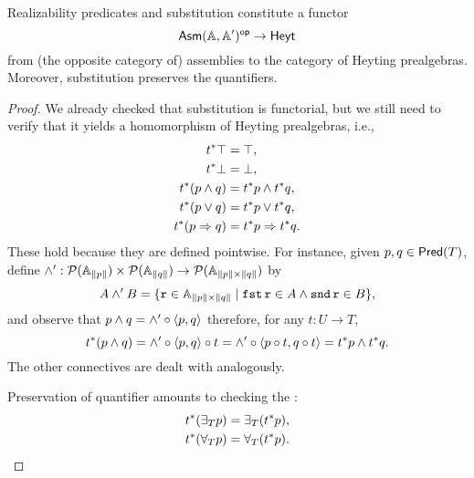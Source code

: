 \begin{proposition}
  Realizability predicates and substitution constitute a functor
  \begin{equation*}
    \mathsf{Asm}(\mathbb{A},\mathbb{A}')^{\mathsf{op}} \to \mathsf{Heyt}
  \end{equation*}
  from (the opposite category of) assemblies to the category of Heyting prealgebras.
  Moreover, substitution preserves the quantifiers.
\end{proposition}

\begin{proof}
  We already checked that substitution is functorial, but we still need to verify
  that it yields a homomorphism of Heyting prealgebras, i.e.,
  \begin{align*}
    t^{*} \top &= \top,\\
    t^{*} \bot &= \bot,\\
    t^{*} (p \land q) &= t^{*} p \land t^{*} q,\\
    t^{*} (p \lor q) &= t^{*} p \lor t^{*} q,\\
    t^{*} (p \Rightarrow q) &= t^{*} p \Rightarrow t^{*} q.
  \end{align*}
  These hold because they are defined pointwise. For instance, given $p, q \in \mathsf{Pred}(T)$, define $\land' : \mathcal{P}(\mathbb{A}_{\|p\|}) \times \mathcal{P}(\mathbb{A}_{\|q\|}) \to \mathcal{P}(\mathbb{A}_{\|p\| \times \|q\|})$ by
  \begin{equation*}
    A \land' B =
    \{ \mathtt{r} \in \mathbb{A}_{\|p\| \times \|q\|} \mid
      \mathtt{fst}\,\mathtt{r} \in A \land \mathtt{snd}\,\mathtt{r} \in B \},
  \end{equation*}
  and observe that $p \land q = \land' \circ \langle p, q \rangle$ therefore, for any $t : U \to T$,
  \begin{equation*}
    t^{*}(p \land q) = \land' \circ \langle p, q \rangle \circ t
    = \land' \circ \langle p \circ t, q \circ t \rangle = t^{*} p \land t^{*} q.
  \end{equation*}
  The other connectives are dealt with analogously.

  Preservation of quantifier amounts to checking the :
  \begin{align*}
    t^{*} (\exists_{T} p) &= \exists_{T} (t^{*} p),\\
    t^{*} (\forall_{T} p) &= \forall_{T} (t^{*} p). \qedhere
  \end{align*}
\end{proof}

